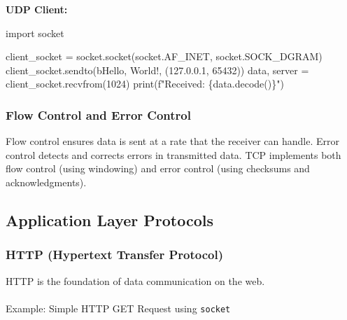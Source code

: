 \documentclass[
  letterpaper,
  DIV=11,
  numbers=noendperiod]{scrreprt}
\makeatletter
\let\oldparagraph\paragraph
\renewcommand{\paragraph}{
    \@ifstar
      \xxxParagraphStar
      \xxxParagraphNoStar
  }
\newcommand{\xxxParagraphStar}[1]{\oldparagraph*{#1}\mbox{}}
\newcommand{\xxxParagraphNoStar}[1]{\oldparagraph{#1}\mbox{}}
\newenvironment{Shaded}{\begin{snugshade}}{\end{snugshade}}
\newcommand{\BuiltInTok}[1]{\textcolor[rgb]{0.00,0.23,0.31}{#1}}
\newcommand{\DecValTok}[1]{\textcolor[rgb]{0.68,0.00,0.00}{#1}}
\newcommand{\ImportTok}[1]{\textcolor[rgb]{0.00,0.46,0.62}{#1}}
\newcommand{\NormalTok}[1]{\textcolor[rgb]{0.00,0.23,0.31}{#1}}
\newcommand{\OperatorTok}[1]{\textcolor[rgb]{0.37,0.37,0.37}{#1}}
\newcommand{\SpecialCharTok}[1]{\textcolor[rgb]{0.37,0.37,0.37}{#1}}
\newcommand{\SpecialStringTok}[1]{\textcolor[rgb]{0.13,0.47,0.30}{#1}}
\newcommand{\StringTok}[1]{\textcolor[rgb]{0.13,0.47,0.30}{#1}}
\makeatother
\begin{document}
\textbf{UDP Client:}

\begin{Shaded}
\begin{Highlighting}[]
\ImportTok{import}\NormalTok{ socket}

\NormalTok{client\_socket }\OperatorTok{=}\NormalTok{ socket.socket(socket.AF\_INET, socket.SOCK\_DGRAM)}
\NormalTok{client\_socket.sendto(}\StringTok{b\textquotesingle{}Hello, World!\textquotesingle{}}\NormalTok{, (}\StringTok{\textquotesingle{}127.0.0.1\textquotesingle{}}\NormalTok{, }\DecValTok{65432}\NormalTok{))}
\NormalTok{data, server }\OperatorTok{=}\NormalTok{ client\_socket.recvfrom(}\DecValTok{1024}\NormalTok{)}
\BuiltInTok{print}\NormalTok{(}\SpecialStringTok{f"Received: }\SpecialCharTok{\{}\NormalTok{data}\SpecialCharTok{.}\NormalTok{decode()}\SpecialCharTok{\}}\SpecialStringTok{"}\NormalTok{)}
\end{Highlighting}
\end{Shaded}

\subsubsection{Flow Control and Error
Control}\label{flow-control-and-error-control}

Flow control ensures data is sent at a rate that the receiver can
handle. Error control detects and corrects errors in transmitted data.
TCP implements both flow control (using windowing) and error control
(using checksums and acknowledgments).

\subsection{Application Layer
Protocols}\label{application-layer-protocols}

\subsubsection{HTTP (Hypertext Transfer
Protocol)}\label{http-hypertext-transfer-protocol}

HTTP is the foundation of data communication on the web.

\paragraph{\texorpdfstring{Example: Simple HTTP GET Request using
\texttt{socket}}{Example: Simple HTTP GET Request using socket}}\label{example-simple-http-get-request-using-socket}
\end{document}

